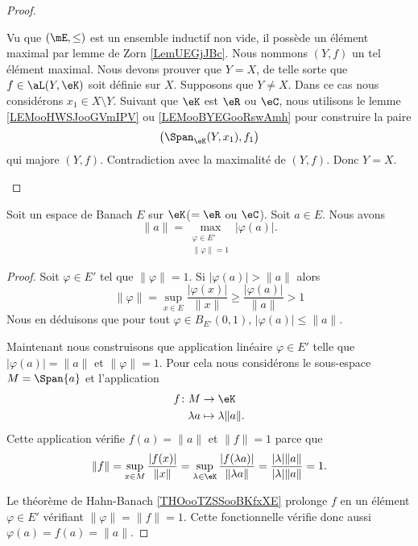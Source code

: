 \begin{proof}
\begin{subproof}
\begin{subproof}
		\end{subproof}
		Vu que \( (\mE,\leq)\) est un ensemble inductif non vide, il possède un élément maximal par lemme de Zorn \ref{LemUEGjJBc}. Nous nommons \( (Y,f)\) un tel élément maximal.
		Nous devons prouver que \( Y=X\), de telle sorte que \( f\in\aL(Y,\eK)\) soit définie sur \( X\). Supposons que \( Y\neq X\). Dans ce cas nous considérons \( x_1\in X\setminus Y\). Suivant que \( \eK\) est \( \eR\) ou \( \eC\), nous utilisons le lemme \ref{LEMooHWSJooGVmIPV} ou \ref{LEMooBYEGooRswAmh} pour construire la paire
		\begin{equation}
			\big( \Span_{\eK}(Y,x_1),f_1 \big)
		\end{equation}
		qui majore \( (Y,f)\). Contradiction avec la maximalité de \( (Y,f)\). Donc \( Y=X\).
	\end{subproof}
\end{proof}

\begin{proposition}          \label{PROPooFJPXooWrjbuH}
	Soit un espace de Banach \( E\) sur \( \eK\)(\( =\eR\) ou \( \eC\)). Soit \( a\in E\). Nous avons
	\begin{equation}
		\| a \|=\max_{\substack{\varphi\in E'\\\| \varphi \|=1}}| \varphi(a) |.
	\end{equation}
\end{proposition}

\begin{proof}
	Soit \( \varphi\in E'\) tel que \( \| \varphi \|=1\). Si \( | \varphi(a) |>\| a \|\) alors
	\begin{equation}
		\| \varphi \|=\sup_{x\in E}\frac{ | \varphi(x) | }{ \| x \| }\geq \frac{ | \varphi(a) | }{ \| a \| }>1
	\end{equation}
	Nous en déduisons que pour tout \( \varphi\in B_{E'}(0,1)\), \( | \varphi(a) |\leq \|a  \|\).

	Maintenant nous construisons que application linéaire \( \varphi\in E'\) telle que \( | \varphi(a) |=\| a \|\) et \( \| \varphi \|=1\). Pour cela nous considérons le sous-espace \( M=\Span\{ a \}\) et l'application
	\begin{equation}
		\begin{aligned}
			f\colon M & \to \eK                 \\
			\lambda a & \mapsto \lambda\| a \|.
		\end{aligned}
	\end{equation}
	Cette application vérifie \( f(a)=\| a \|\) et \( \| f\|=1\) parce que
	\begin{equation}
		\| f \|=\sup_{x\in M}\frac{ | f(x) | }{ \| x \| }=\sup_{\lambda\in\eK}\frac{ | f(\lambda a) | }{ \| \lambda a \| }=\frac{ | \lambda |\| a \| }{ | \lambda |\| a \| }=1.
	\end{equation}

	Le théorème de Hahn-Banach \ref{THOooTZSSooBKfxXE} prolonge \( f\) en un élément \( \varphi\in E'\) vérifiant \( \| \varphi \|=\| f \|=1\). Cette fonctionnelle vérifie donc aussi \( \varphi(a)=f(a)=\| a \|\).
\end{proof}

